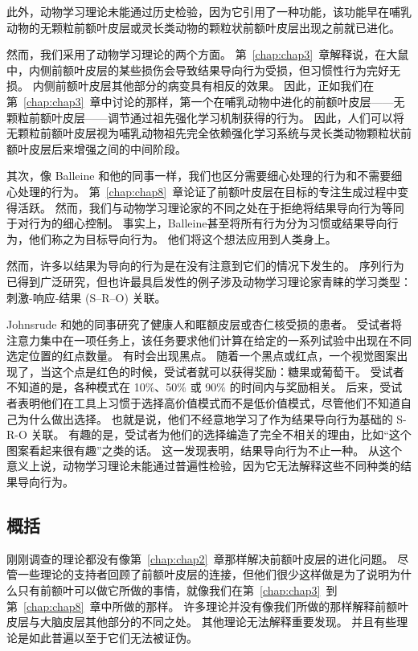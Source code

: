 此外，动物学习理论未能通过历史检验，因为它引用了一种功能，该功能早在哺乳动物的无颗粒前额叶皮层或灵长类动物的颗粒状前额叶皮层出现之前就已进化。
\par


然而，我们采用了动物学习理论的两个方面。
第~\ref{chap:chap3}~章解释说，在大鼠中，内侧前额叶皮层的某些损伤会导致结果导向行为受损，但习惯性行为完好无损。
内侧前额叶皮层其他部分的病变具有相反的效果。
因此，正如我们在第~\ref{chap:chap3}~章中讨论的那样，第一个在哺乳动物中进化的前额叶皮层——无颗粒前额叶皮层——调节通过祖先强化学习机制获得的行为。
因此，人们可以将无颗粒前额叶皮层视为哺乳动物祖先完全依赖强化学习系统与灵长类动物颗粒状前额叶皮层后来增强之间的中间阶段。
\par


其次，像 Balleine 和他的同事一样，我们也区分需要细心处理的行为和不需要细心处理的行为。
第~\ref{chap:chap8}~章论证了前额叶皮层在目标的专注生成过程中变得活跃。
然而，我们与动物学习理论家的不同之处在于拒绝将结果导向行为等同于对行为的细心控制。
事实上，Balleine\cite{balleine2010human}甚至将所有行为分为习惯或结果导向行为，他们称之为目标导向行为。
他们将这个想法应用到人类身上。
\par


然而，许多以结果为导向的行为是在没有注意到它们的情况下发生的。
序列行为已得到广泛研究，但也许最具启发性的例子涉及动物学习理论家青睐的学习类型：刺激-响应-结果 (S–R–O) 关联。
\par


Johnsrude 和她的同事\cite{johnsrude2000impaired}研究了健康人和眶额皮层或杏仁核受损的患者。
受试者将注意力集中在一项任务上，该任务要求他们计算在给定的一系列试验中出现在不同选定位置的红点数量。
有时会出现黑点。
随着一个黑点或红点，一个视觉图案出现了，当这个点是红色的时候，受试者就可以获得奖励：糖果或葡萄干。
受试者不知道的是，各种模式在 10$\%$、50$\%$ 或 90$\%$ 的时间内与奖励相关。
后来，受试者表明他们在工具上习惯于选择高价值模式而不是低价值模式，尽管他们不知道自己为什么做出选择。
也就是说，他们不经意地学习了作为结果导向行为基础的 S-R-O 关联。
有趣的是，受试者为他们的选择编造了完全不相关的理由，比如“这个图案看起来很有趣”之类的话。
这一发现表明，结果导向行为不止一种。
从这个意义上说，动物学习理论未能通过普遍性检验，因为它无法解释这些不同种类的结果导向行为。



\subsection{概括}

刚刚调查的理论都没有像第~\ref{chap:chap2}~章那样解决前额叶皮层的进化问题。
尽管一些理论的支持者回顾了前额叶皮层的连接，但他们很少这样做是为了说明为什么只有前额叶可以做它所做的事情，就像我们在第~\ref{chap:chap3}~到第~\ref{chap:chap8}~章中所做的那样。
许多理论并没有像我们所做的那样解释前额叶皮层与大脑皮层其他部分的不同之处。
其他理论无法解释重要发现。 并且有些理论是如此普遍以至于它们无法被证伪。



